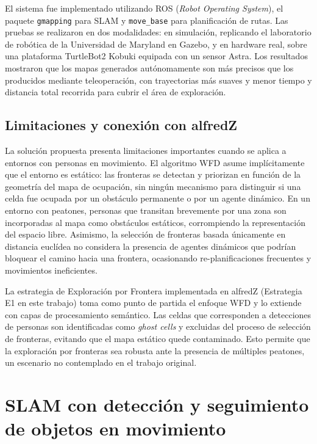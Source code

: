 El sistema fue implementado utilizando ROS (\textit{Robot Operating
System}), el paquete \texttt{gmapping} para SLAM y \texttt{move\_base} para
planificación de rutas. Las pruebas se realizaron en dos modalidades: en
simulación, replicando el laboratorio de robótica de la Universidad de
Maryland en Gazebo, y en hardware real, sobre una plataforma TurtleBot2
Kobuki equipada con un sensor Astra. Los resultados mostraron que los mapas
generados autónomamente son más precisos que los producidos mediante
teleoperación, con trayectorias más suaves y menor tiempo y distancia total
recorrida para cubrir el área de exploración.

\subsection{Limitaciones y conexión con alfredZ}

La solución propuesta presenta limitaciones importantes cuando se aplica a
entornos con personas en movimiento. El algoritmo WFD asume implícitamente
que el entorno es estático: las fronteras se detectan y priorizan en función
de la geometría del mapa de ocupación, sin ningún mecanismo para distinguir
si una celda fue ocupada por un obstáculo permanente o por un agente
dinámico. En un entorno con peatones, personas que transitan brevemente por
una zona son incorporadas al mapa como obstáculos estáticos, corrompiendo la
representación del espacio libre. Asimismo, la selección de fronteras
basada únicamente en distancia euclídea no considera la presencia de agentes
dinámicos que podrían bloquear el camino hacia una frontera, ocasionando
re-planificaciones frecuentes y movimientos ineficientes.

La estrategia de Exploración por Frontera implementada en alfredZ (Estrategia
E1 en este trabajo) toma como punto de partida el enfoque WFD y lo extiende
con capas de procesamiento semántico. Las celdas que corresponden a
detecciones de personas son identificadas como \textit{ghost cells} y
excluidas del proceso de selección de fronteras, evitando que el mapa
estático quede contaminado. Esto permite que la exploración por fronteras
sea robusta ante la presencia de múltiples peatones, un escenario no
contemplado en el trabajo original.

\section{SLAM con detección y seguimiento de objetos en movimiento}

